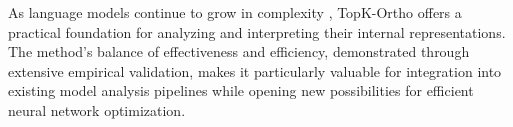 \documentclass{article} %
\begin{document}
As language models continue to grow in complexity \cite{gpt4}, TopK-Ortho offers a practical foundation for analyzing and interpreting their internal representations. The method's balance of effectiveness and efficiency, demonstrated through extensive empirical validation, makes it particularly valuable for integration into existing model analysis pipelines while opening new possibilities for efficient neural network optimization.



\end{document}
